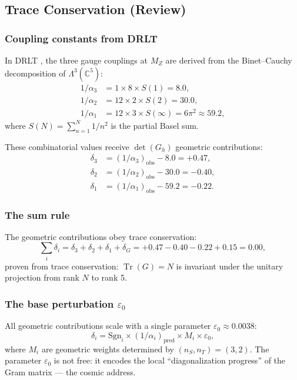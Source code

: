 \documentclass[12pt]{article}
\theoremstyle{remark}
\theoremstyle{definition}
\newcommand{\CC}{\mathbb{C}}
\newcommand{\tr}{\operatorname{Tr}}
\begin{document}
\subsection{Trace Conservation (Review)}

\subsubsection{Coupling constants from DRLT}

In DRLT , the three gauge couplings at $M_Z$ are derived from the Binet--Cauchy decomposition of $\Lambda^3(\CC^5)$:
\begin{align}
1/\alpha_3 &= 1 \times 8 \times S(1) = 8.0, \\
1/\alpha_2 &= 12 \times 2 \times S(2) = 30.0, \\
1/\alpha_1 &= 12 \times 3 \times S(\infty) = 6\pi^2 \approx 59.2,
\end{align}
where $S(N) = \sum_{n=1}^{N} 1/n^2$ is the partial Basel sum.

These combinatorial values receive $\det(G_h)$ geometric contributions:
\begin{align}
\delta_3 &= (1/\alpha_3)_\text{obs} - 8.0 = +0.47, \\
\delta_2 &= (1/\alpha_2)_\text{obs} - 30.0 = -0.40, \\
\delta_1 &= (1/\alpha_1)_\text{obs} - 59.2 = -0.22.
\end{align}

\subsubsection{The sum rule}

The geometric contributions obey trace conservation:
\begin{equation}
\sum_i \delta_i = \delta_3 + \delta_2 + \delta_1 + \delta_G = +0.47 - 0.40 - 0.22 + 0.15 = 0.00,
\end{equation}
proven from trace conservation: $\tr(G) = N$ is invariant under the unitary projection from rank $N$ to rank 5.

\subsubsection{The base perturbation $\varepsilon_0$}

All geometric contributions scale with a single parameter $\varepsilon_0 \approx 0.0038$:
\begin{equation}
\delta_i = \text{Sgn}_i \times (1/\alpha_i)_\text{pred} \times M_i \times \varepsilon_0,
\end{equation}
where $M_i$ are geometric weights determined by $(n_S, n_T) = (3, 2)$. The parameter $\varepsilon_0$ is not free: it encodes the local ``diagonalization progress'' of the Gram matrix --- the cosmic address.
\end{document}
